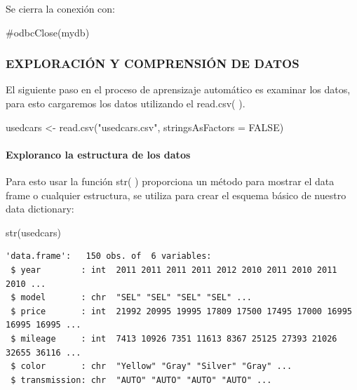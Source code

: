 \documentclass[
  letterpaper,
  DIV=11,
  numbers=noendperiod]{scrartcl}
\let\oldparagraph\paragraph
\renewcommand{\paragraph}[1]{\oldparagraph{#1}\mbox{}}
\newenvironment{Shaded}{\begin{snugshade}}{\end{snugshade}}
\newcommand{\AttributeTok}[1]{\textcolor[rgb]{0.40,0.45,0.13}{#1}}
\newcommand{\CommentTok}[1]{\textcolor[rgb]{0.37,0.37,0.37}{#1}}
\newcommand{\ConstantTok}[1]{\textcolor[rgb]{0.56,0.35,0.01}{#1}}
\newcommand{\FunctionTok}[1]{\textcolor[rgb]{0.28,0.35,0.67}{#1}}
\newcommand{\NormalTok}[1]{\textcolor[rgb]{0.00,0.23,0.31}{#1}}
\newcommand{\OtherTok}[1]{\textcolor[rgb]{0.00,0.23,0.31}{#1}}
\newcommand{\StringTok}[1]{\textcolor[rgb]{0.13,0.47,0.30}{#1}}
\begin{document}
Se cierra la conexión con:

\begin{Shaded}
\begin{Highlighting}[]
\CommentTok{\#odbcClose(mydb)}
\end{Highlighting}
\end{Shaded}

\hypertarget{exploraciuxf3n-y-comprensiuxf3n-de-datos}{%
\subsubsection{EXPLORACIÓN Y COMPRENSIÓN DE
DATOS}\label{exploraciuxf3n-y-comprensiuxf3n-de-datos}}

El siguiente paso en el proceso de aprensizaje automático es examinar
los datos, para esto cargaremos los datos utilizando el read.csv( ).

\begin{Shaded}
\begin{Highlighting}[]
\NormalTok{usedcars }\OtherTok{\textless{}{-}} \FunctionTok{read.csv}\NormalTok{(}\StringTok{"usedcars.csv"}\NormalTok{, }\AttributeTok{stringsAsFactors =} \ConstantTok{FALSE}\NormalTok{)}
\end{Highlighting}
\end{Shaded}

\hypertarget{exploranco-la-estructura-de-los-datos}{%
\paragraph{Exploranco la estructura de los
datos}\label{exploranco-la-estructura-de-los-datos}}

Para esto usar la función str( ) proporciona un método para mostrar el
data frame o cualquier estructura, se utiliza para crear el esquema
básico de nuestro data dictionary:

\begin{Shaded}
\begin{Highlighting}[]
\FunctionTok{str}\NormalTok{(usedcars)}
\end{Highlighting}
\end{Shaded}

\begin{verbatim}
'data.frame':   150 obs. of  6 variables:
 $ year        : int  2011 2011 2011 2011 2012 2010 2011 2010 2011 2010 ...
 $ model       : chr  "SEL" "SEL" "SEL" "SEL" ...
 $ price       : int  21992 20995 19995 17809 17500 17495 17000 16995 16995 16995 ...
 $ mileage     : int  7413 10926 7351 11613 8367 25125 27393 21026 32655 36116 ...
 $ color       : chr  "Yellow" "Gray" "Silver" "Gray" ...
 $ transmission: chr  "AUTO" "AUTO" "AUTO" "AUTO" ...
\end{verbatim}
\end{document}
